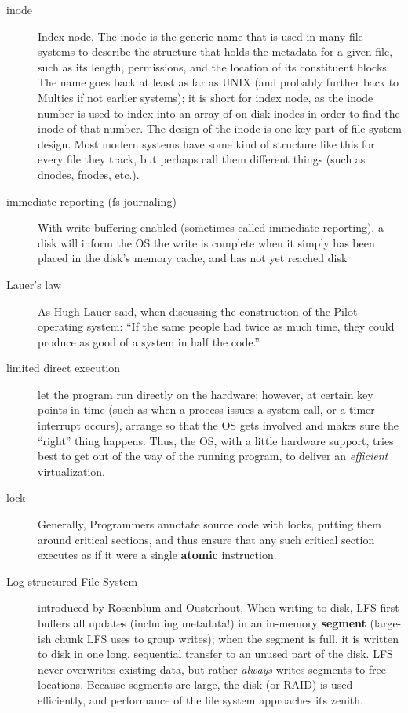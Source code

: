 \begin{description}
\item[inode] Index node. The inode is the generic name that is used in many file systems to describe the structure that holds the metadata for a given file, such as its length, permissions, and the location of its constituent blocks. The name
goes back at least as far as UNIX (and probably further back to Multics if not earlier systems); it is short for index node, as the inode number is used to index into an array of on-disk inodes in order to find the inode of that number. The design of the inode is one key part of file system design. Most modern systems have some kind of structure like this for every file they track, but perhaps call them different things (such as dnodes, fnodes, etc.).

\item[immediate reporting (fs journaling)] With write buffering enabled (sometimes called immediate reporting), a disk will inform the OS the write is complete when it simply has been placed in the disk’s memory cache, and has not yet reached disk

\item[Lauer's law] As Hugh Lauer said, when discussing the construction of the Pilot operating system: ``If the same people had twice as much time, they could produce as good of a system in half the code.''

\item[limited direct execution] let the program run directly on the hardware; however, at certain key points in time (such as when a process issues a system call, or a timer interrupt occurs), arrange so that the OS gets involved and makes sure the ``right'' thing happens.   Thus, the OS, with a little hardware support, tries best to get out of the way of the running program, to deliver an \emph{efficient} virtualization.

\item[lock] Generally, Programmers annotate source code with locks, putting them around critical sections, and thus ensure that any such critical section executes as if it were a single \textbf{atomic} instruction.

\item[Log-structured File System] introduced by Rosenblum and Ousterhout, When writing to disk, LFS first buffers all updates (including metadata!) in an in-memory \textbf{segment} (large-ish chunk LFS uses to group writes); when the segment is full, it is written to disk in one long, sequential transfer to an unused part of the disk. LFS never overwrites existing data, but rather \emph{always} writes segments to free locations. Because segments are large, the disk (or RAID) is used efficiently, and performance of the file system approaches its zenith.


\end{description}
